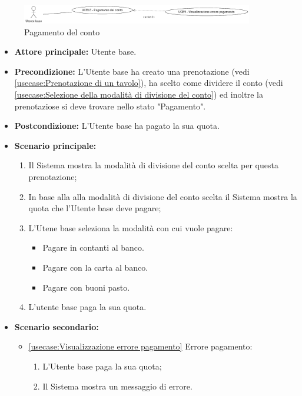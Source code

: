 \label{usecase:Pagamento del conto}

\begin{figure}[h]
	\centering
	\includegraphics[width=0.9\textwidth]{./uml/UCB13.png} 
	\caption{Pagamento del conto}
	\label{fig:UCB15}
  \end{figure}

\begin{itemize}
	\item \textbf{Attore principale:} Utente base.

	\item \textbf{Precondizione:} L'Utente base ha creato una prenotazione (vedi \autoref{usecase:Prenotazione di un tavolo}), ha 
	scelto come dividere il conto (vedi \autoref{usecase:Selezione della modalità di divisione del conto}) ed inoltre la prenotaziose si deve trovare nello stato "Pagamento".

	\item \textbf{Postcondizione:} L'Utente base ha pagato la sua quota.

	\item \textbf{Scenario principale:}
            \begin{enumerate}
				\item Il Sistema mostra la modalità di divisione del conto scelta per questa prenotazione;
                \item In base alla alla modalità di divisione del conto scelta il Sistema mostra la quota che l'Utente base deve pagare;
                \item L'Utene base seleziona la modalità con cui vuole pagare:
                \begin{itemize}
                    \item Pagare in contanti al banco.
                    \item Pagare con la carta al banco.
                    \item Pagare con buoni pasto.
                \end{itemize}
				\item L'utente base paga la sua quota.
	      \end{enumerate}

    \item \textbf{Scenario secondario:}
		  \begin{itemize}
			  \item \autoref{usecase:Visualizzazione errore pagamento} Errore pagamento:
				\begin{enumerate}
					\item L'Utente base paga la sua quota;
					\item  Il Sistema mostra un messaggio di errore.
				\end{enumerate}
		  \end{itemize}
\end{itemize}